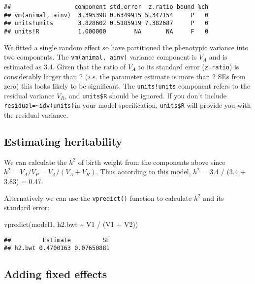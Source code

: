 \documentclass[
  12pt,
]{book}
\newenvironment{Shaded}{\begin{snugshade}}{\end{snugshade}}
\newcommand{\FunctionTok}[1]{\textcolor[rgb]{0.00,0.00,0.00}{#1}}
\newcommand{\NormalTok}[1]{#1}
\newcommand{\SpecialCharTok}[1]{\textcolor[rgb]{0.00,0.00,0.00}{#1}}
\begin{document}
\begin{verbatim}
##                  component std.error  z.ratio bound %ch
## vm(animal, ainv)  3.395398 0.6349915 5.347154     P   0
## units!units       3.828602 0.5185919 7.382687     P   0
## units!R           1.000000        NA       NA     F   0
\end{verbatim}

We fitted a single random effect so have partitioned the phenotypic variance into two components. The \texttt{vm(animal,\ ainv)} variance component is \(V_A\) and is estimated as 3.4. Given that the ratio of \(V_A\) to its standard error (\texttt{z.ratio}) is considerably larger than 2 (\emph{i.e.} the parameter estimate is more than 2 SEs from zero) this looks likely to be significant. The \texttt{units!units} component refers to the residual variance \(V_R\), and \texttt{units\$R} should be ignored. If you don't include \texttt{residual=\textasciitilde{}idv(units)}in your model specification, \texttt{units\$R} will provide you with the residual variance.

\hypertarget{estimating-heritability}{%
\subsection{Estimating heritability}\label{estimating-heritability}}

We can calculate the \(h^2\) of birth weight from the components above since \(h^2 = V_A/V_P = V_A/(V_A+V_R)\). Thus according to this model, \(h^2\) = 3.4 / (3.4 + 3.83) = 0.47.

Alternatively we can use the \texttt{vpredict()} function to calculate \(h^2\) and its standard error:

\begin{Shaded}
\begin{Highlighting}[]
\FunctionTok{vpredict}\NormalTok{(model1, h2.bwt }\SpecialCharTok{\textasciitilde{}}\NormalTok{ V1 }\SpecialCharTok{/}\NormalTok{ (V1 }\SpecialCharTok{+}\NormalTok{ V2))}
\end{Highlighting}
\end{Shaded}

\begin{verbatim}
##         Estimate         SE
## h2.bwt 0.4700163 0.07650881
\end{verbatim}

\hypertarget{adding-fixed-effects}{%
\subsection{Adding fixed effects}\label{adding-fixed-effects}}
\end{document}
